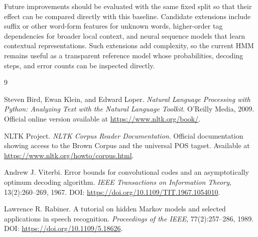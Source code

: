 \documentclass[12pt,a4paper]{article}
\newcommand{\sectionbreakguard}{\Needspace{8\baselineskip}}
\begin{document}
Future improvements should be evaluated with the same fixed split so that their
effect can be compared directly with this baseline. Candidate extensions include
suffix or other word-form features for unknown words, higher-order tag
dependencies for broader local context, and neural sequence models that learn
contextual representations. Such extensions add complexity, so the current HMM
remains useful as a transparent reference model whose probabilities, decoding
steps, and error counts can be inspected directly.

\sectionbreakguard
\begingroup
\fontsize{10}{12}\selectfont
\begin{thebibliography}{9}

Steven Bird, Ewan Klein, and Edward Loper.
\textit{Natural Language Processing with Python: Analyzing Text with the Natural Language Toolkit}.
O'Reilly Media, 2009. Official online version available at
\url{https://www.nltk.org/book/}.

NLTK Project.
\textit{NLTK Corpus Reader Documentation}.
Official documentation showing access to the Brown Corpus and the universal POS
tagset. Available at \url{https://www.nltk.org/howto/corpus.html}.

Andrew J. Viterbi.
Error bounds for convolutional codes and an asymptotically optimum decoding
algorithm.
\textit{IEEE Transactions on Information Theory}, 13(2):260--269, 1967.
DOI: \url{https://doi.org/10.1109/TIT.1967.1054010}.

Lawrence R. Rabiner.
A tutorial on hidden Markov models and selected applications in speech
recognition.
\textit{Proceedings of the IEEE}, 77(2):257--286, 1989.
DOI: \url{https://doi.org/10.1109/5.18626}.

\end{thebibliography}
\endgroup
\end{document}
